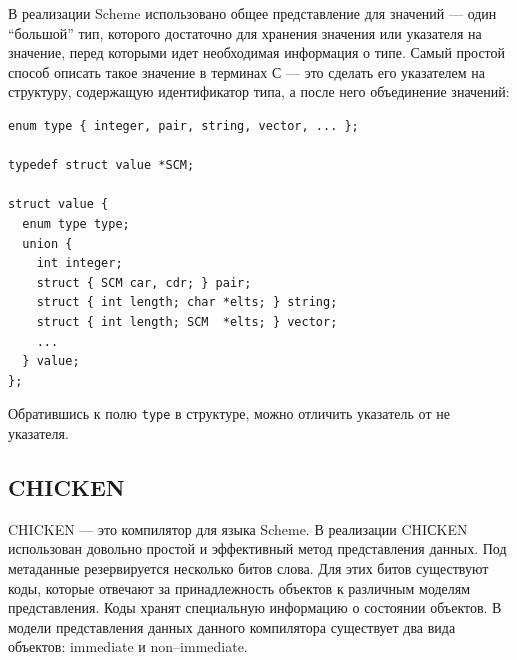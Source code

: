 
В реализации Scheme использовано общее представление для значений ---
один ``большой'' тип, которого достаточно для хранения значения или указателя на значение,
перед которыми идет необходимая информация о типе. Самый простой способ описать такое значение в терминах С --- 
это сделать его указателем на структуру, содержащую идентификатор типа, а после него объединение 
значений:

\begin{lstlisting}
enum type { integer, pair, string, vector, ... };
  
typedef struct value *SCM;
  
struct value {
  enum type type;
  union {
    int integer;
    struct { SCM car, cdr; } pair;
    struct { int length; char *elts; } string;
    struct { int length; SCM  *elts; } vector;
    ...
  } value;
};
\end{lstlisting}

Обратившись к полю \texttt{type} в структуре, можно отличить указатель от не указателя.

\subsection {CHICKEN}

CHICKEN --- это компилятор для языка Scheme. В реализации CHIСKEN использован довольно простой и эффективный метод представления данных.
Под метаданные резервируется несколько битов слова. Для этих битов существуют коды, которые отвечают за
принадлежность объектов к различным моделям представления. Коды хранят специальную информацию о состоянии объектов.
В  модели представления данных данного компилятора
существует два вида объектов: immediate и non--immediate.

